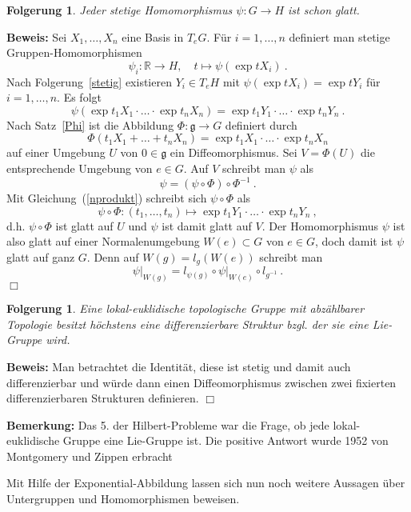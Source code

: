 \documentclass[12pt,a4paper]{article}
\def\R{\mathbb{R}}
\def\g{\mathfrak{g}}
\newtheorem{Folgerung}[Lemma]{Folgerung}
\def\proof{\noindent\textbf{Beweis:}\quad}
\def\qed{\quad\hfill\ensuremath{\Box}}
\begin{document}
\bigskip

\begin{Folgerung}
Jeder stetige Homomorphismus $\psi : G \rightarrow H$ ist schon glatt.
\end{Folgerung}
\proof
Sei $X_1, \ldots, X_n$ eine Basis in $T_eG$. F\"ur $i=1, \ldots, n$ definiert man
stetige Gruppen-Homomorphismen
$$
\psi_i : \R \rightarrow H,\quad t \mapsto \psi(\exp tX_i) \ .
$$
Nach Folgerung~\ref{stetig} existieren $Y_i \in T_eH$ mit
$\psi(\exp tX_i) = \exp tY_i$ f\"ur $i=1,\ldots, n$. Es folgt
\begin{equation}\label{nprodukt}
\psi(\exp t_1X_1 \cdot \ldots \cdot \exp t_n X_n)
=
\exp t_1 Y_1 \cdot \ldots \cdot \exp t_n Y_n \ .
\end{equation}
Nach Satz~\ref{Phi} ist die Abbildung $\Phi : \g \rightarrow G$ definiert durch
$$
\Phi(t_1X_1 + \ldots + t_nX_n) = \exp t_1X_1 \cdot \ldots \cdot \exp t_n X_n
$$
auf einer Umgebung $U$ von $0\in \g$ ein Diffeomorphismus. Sei $V= \Phi(U)$
die entsprechende Umgebung von $e\in G$. Auf $V$ schreibt man $\psi $ als
$$
\psi = (\psi \circ \Phi) \circ \Phi^{-1} \ .
$$
Mit Gleichung~(\ref{nprodukt}) schreibt sich $\psi \circ \Phi$ als
$$
\psi \circ \Phi : (t_1,\ldots, t_n)
\mapsto \exp t_1 Y_1 \cdot \ldots \cdot \exp t_n Y_n  \ ,
$$
d.h. $\psi \circ \Phi$ ist glatt auf $U$ und $\psi$ ist damit glatt
auf $V$. Der Homomorphismus $\psi$ ist also glatt auf einer Normalenumgebung
$W(e) \subset G$ von $e\in G$, doch damit ist $\psi$ glatt auf ganz $G$. Denn
auf $W(g) = l_g(W(e))$ schreibt man
$$
\left. \psi\right|_{W(g)} = l_{\psi(g)} \circ \left.\psi\right|_{W(e)} \circ l_{g^{-1}} \ .
$$
\qed

\bigskip

\begin{Folgerung}
Eine lokal-euklidische topologische Gruppe mit abz\"ahlbarer Topologie besitzt h\"ochstens
eine differenzierbare Struktur bzgl. der sie eine Lie-Gruppe wird.
\end{Folgerung}
\proof
Man betrachtet die Identit\"at, diese ist stetig und damit auch differenzierbar und w\"urde
dann einen Diffeomorphismus zwischen zwei fixierten differenzierbaren Strukturen definieren.
\qed

\bigskip

{\bf Bemerkung:} Das 5. der Hilbert-Probleme war die Frage, ob jede lokal-euklidische Gruppe eine
Lie-Gruppe ist. Die positive Antwort wurde 1952 von Montgomery und Zippen erbracht

\bigskip

Mit Hilfe der Exponential-Abbildung lassen sich nun noch weitere Aussagen \"uber Untergruppen und
Homomorphismen beweisen.
\end{document}

